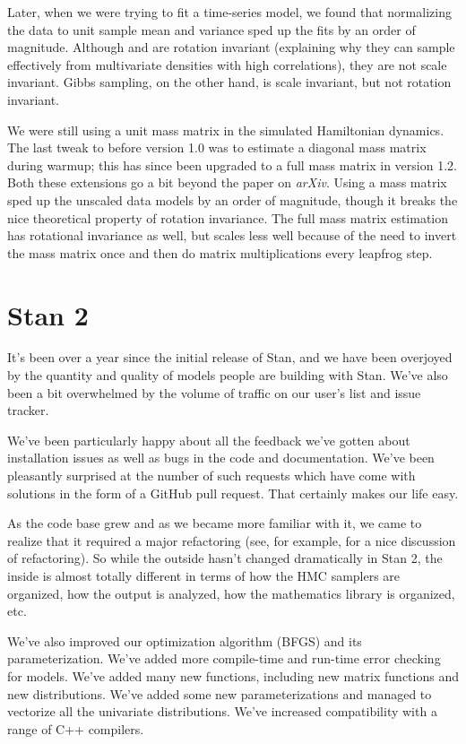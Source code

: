 Later, when we were trying to fit a time-series model, we found that
normalizing the data to unit sample mean and variance sped up the fits
by an order of magnitude.  Although \HMC and \NUTS are rotation
invariant (explaining why they can sample effectively from
multivariate densities with high correlations), they are not scale
invariant.  Gibbs sampling, on the other hand, is scale invariant, but
not rotation invariant.

We were still using a unit mass matrix in the simulated Hamiltonian
dynamics.  The last tweak to \Stan before version 1.0 was to estimate
a diagonal mass matrix during warmup; this has since been upgraded to
a full mass matrix in version 1.2.  Both these extensions go a bit
beyond the \NUTS paper on {\it arXiv}.  Using a mass matrix sped up
the unscaled data models by an order of magnitude, though it breaks
the nice theoretical property of rotation invariance.  The full mass
matrix estimation has rotational invariance as well, but scales less
well because of the need to invert the mass matrix once and then do matrix
multiplications every leapfrog step.

\section*{Stan 2}

It's been over a year since the initial release of Stan, and we have
been overjoyed by the quantity and quality of models people are
building with Stan.  We've also been a bit overwhelmed by the volume
of traffic on our user's list and issue tracker.

We've been particularly happy about all the feedback we've gotten
about installation issues as well as bugs in the code and
documentation.  We've been pleasantly surprised at the number of such
requests which have come with solutions in the form of a GitHub pull
request.  That certainly makes our life easy.

As the code base grew and as we became more familiar with it, we came
to realize that it required a major refactoring (see, for example,
\citep{FowlerEtAl:1999} for a nice discussion of refactoring).  So
while the outside hasn't changed dramatically in Stan 2, the inside is
almost totally different in terms of how the HMC samplers are
organized, how the output is analyzed, how the mathematics library is
organized, etc.  

We've also improved our optimization algorithm (BFGS) and its
parameterization.  We've added more compile-time and run-time error
checking for models.  We've added many new functions, including new
matrix functions and new distributions.  We've added some new
parameterizations and managed to vectorize all the univariate
distributions.  We've increased compatibility with a range of C++
compilers.  

